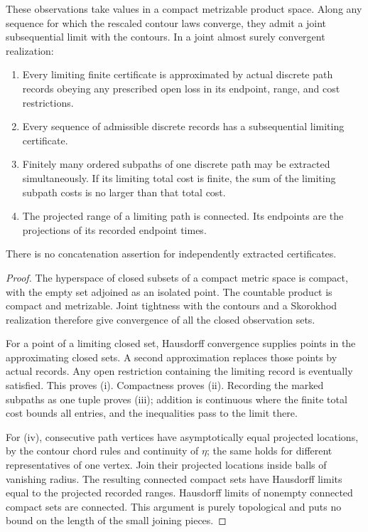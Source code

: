 \begin{lemma}\label{bg:certificates}
These observations take values in a compact metrizable product space. Along any sequence for which the rescaled contour laws converge, they admit a joint subsequential limit with the contours. In a joint almost surely convergent realization:
\begin{enumerate}[label=(\roman*)]
\item Every limiting finite certificate is approximated by actual discrete path records obeying any prescribed open loss in its endpoint, range, and cost restrictions.
\item Every sequence of admissible discrete records has a subsequential limiting certificate.
\item Finitely many ordered subpaths of one discrete path may be extracted simultaneously. If its limiting total cost is finite, the sum of the limiting subpath costs is no larger than that total cost.
\item The projected range of a limiting path is connected. Its endpoints are the projections of its recorded endpoint times.
\end{enumerate}
There is no concatenation assertion for independently extracted certificates.
\end{lemma}
\begin{proof}
The hyperspace of closed subsets of a compact metric space is compact, with the empty set adjoined as an isolated point. The countable product is compact and metrizable. Joint tightness with the contours and a Skorokhod realization therefore give convergence of all the closed observation sets.

For a point of a limiting closed set, Hausdorff convergence supplies points in the approximating closed sets. A second approximation replaces those points by actual records. Any open restriction containing the limiting record is eventually satisfied. This proves (i). Compactness proves (ii). Recording the marked subpaths as one tuple proves (iii); addition is continuous where the finite total cost bounds all entries, and the inequalities pass to the limit there.

For (iv), consecutive path vertices have asymptotically equal projected locations, by the contour chord rules and continuity of \(\eta\); the same holds for different representatives of one vertex. Join their projected locations inside balls of vanishing radius. The resulting connected compact sets have Hausdorff limits equal to the projected recorded ranges. Hausdorff limits of nonempty connected compact sets are connected. This argument is purely topological and puts no bound on the length of the small joining pieces.
\end{proof}

